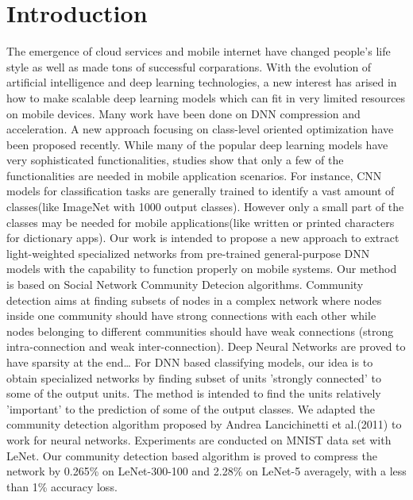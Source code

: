 \documentclass{acmtog} %
\begin{document}
\section{Introduction}
The emergence of cloud services and mobile internet have changed people's life style as well as made tons of successful corparations.  With the evolution of artificial intelligence and deep learning technologies, a new interest has arised in how to make scalable deep learning models which can fit in very limited resources on mobile devices.
Many work have been done on DNN compression and acceleration\cite{Deep Compression}\cite{Speedup CNN}.  A new approach focusing on class-level oriented optimization have been proposed recently\cite{CAPTOR}. While many of the popular deep learning models have very sophisticated functionalities, studies show\cite{Image Recog App} that only a few of the functionalities are needed in mobile application scenarios. For instance, CNN models for classification tasks are generally trained to identify a vast amount of classes(like ImageNet with 1000 output classes). However only a small part of the classes may be needed for mobile applications(like written or printed characters for dictionary apps). Our work is intended to propose a new approach to extract light-weighted specialized networks from pre-trained general-purpose DNN models with the capability to function properly on mobile systems.
Our method is based on Social Network Community Detecion algorithms. Community detection aims at finding subsets of nodes in a complex network where nodes inside one community should have strong connections with each other while nodes belonging to different communities should have weak connections (strong intra-connection and weak inter-connection). Deep Neural Networks are proved to have sparsity at the end… For DNN based classifying models, our idea is to obtain specialized networks by finding subset of units 'strongly connected' to some of the output units. The method is intended to find the units relatively 'important' to the prediction of some of the output classes. We adapted the community detection algorithm proposed by Andrea Lancichinetti et al.(2011)\cite{OSLOM} to work for neural networks.
Experiments are conducted on MNIST\cite{MNIST} data set with LeNet. Our community detection based algorithm is proved to compress the network by 0.265\% on LeNet-300-100 and 2.28\% on LeNet-5 averagely, with a less than 1\% accuracy loss.
\end{document}
